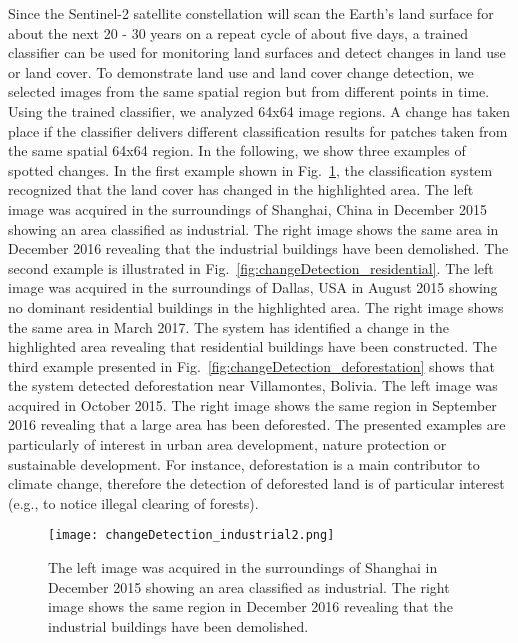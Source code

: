 \documentclass[journal]{IEEEtran}
\begin{document}
Since the Sentinel-2 satellite constellation will scan the Earth's land surface for about the next 20 - 30 years on a repeat cycle of about five days, a trained classifier can be used for monitoring land surfaces and detect changes in land use or land cover. To demonstrate land use and land cover change detection, we selected images from the same spatial region but from different points in time. Using the trained classifier, we analyzed 64x64 image regions. A change has taken place if the classifier delivers different classification results for patches taken from the same spatial 64x64 region. In the following, we show three examples of spotted changes. In the first example shown in Fig.~\ref{fig:changeDetection_industrial}, the classification system recognized that the land cover has changed in the highlighted area. The left image was acquired in the surroundings of Shanghai, China in December 2015 showing an area classified as industrial. The right image shows the same area in December 2016 revealing that the industrial buildings have been demolished. The second example is illustrated in Fig.~\ref{fig:changeDetection_residential}. The left image was acquired in the surroundings of Dallas, USA in August 2015 showing no dominant residential buildings in the highlighted area. The right image shows the same area in March 2017. The system has identified a change in the highlighted area revealing that residential buildings have been constructed. The third example presented in Fig.~\ref{fig:changeDetection_deforestation} shows that the system detected deforestation near Villamontes, Bolivia. The left image was acquired in October 2015. The right image shows the same region in September 2016 revealing that a large area has been deforested. The presented examples are particularly of interest in urban area development, nature protection or sustainable development. For instance, deforestation is a main contributor to climate change, therefore the detection of deforested land is of particular interest (e.g., to notice illegal clearing of forests).



\begin{figure}[h!]
	\centering
	\texttt{[image: changeDetection\_industrial2.png]}
	\caption{The left image was acquired in the surroundings of Shanghai in December 2015 showing an area classified as industrial. The right image shows the same region in December 2016 revealing that the industrial buildings have been demolished.}
	
	\label{fig:changeDetection_industrial}
\end{figure}
\end{document}
